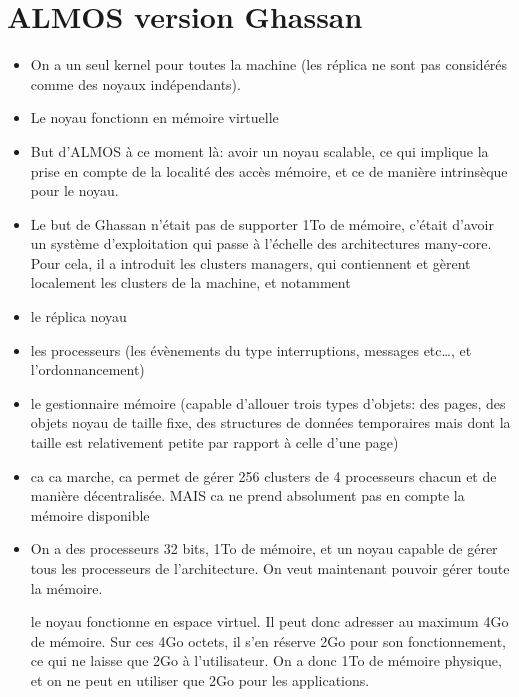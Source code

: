 \section{ALMOS version Ghassan}

\begin{itemize}

\item On a un seul kernel pour toutes la machine (les réplica ne
                sont pas considérés comme des noyaux indépendants).

         \item Le noyau fonctionn en mémoire virtuelle

         \item But d'ALMOS à ce moment là: avoir un noyau scalable, ce qui
         implique la prise en compte de la localité des accès mémoire, et ce de
         manière intrinsèque pour le noyau.
        
        \item Le but de Ghassan n'était pas de supporter 1To de mémoire, c'était
        d'avoir un système d'exploitation qui passe à l'échelle des
        architectures many-core. Pour cela, il a introduit les clusters
        managers, qui contiennent et gèrent localement les clusters de la
        machine, et notamment \benumline \item le réplica noyau \item les
        processeurs (les évènements du type interruptions, messages etc\ldots,
                        et l'ordonnancement) \item le gestionnaire mémoire
        (capable d'allouer trois types d'objets: des pages, des objets noyau de
         taille fixe, des structures de données temporaires mais dont la taille
         est relativement petite par rapport à celle d'une page) \eenumline


                        \item ca ca marche, ca permet de gérer 256 clusters de 4
                        processeurs chacun et de manière décentralisée. MAIS ca
                        ne prend absolument pas en compte la mémoire disponible

\item {} On a des processeurs 32 bits, 1To de mémoire, et un
noyau capable de gérer tous les processeurs de l'architecture. On veut
maintenant pouvoir gérer toute la mémoire.

le noyau fonctionne en espace virtuel. Il peut donc adresser au maximum 4Go de
mémoire. Sur ces 4Go octets, il s'en réserve 2Go pour son fonctionnement, ce qui
ne laisse que 2Go à l'utilisateur. On a donc 1To de mémoire physique, et on ne
peut en utiliser que 2Go pour les applications.  \end{itemize}

